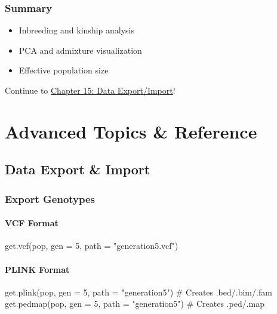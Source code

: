 \documentclass[
  letterpaper,
]{book}
\newenvironment{Shaded}{\begin{snugshade}}{\end{snugshade}}
\newcommand{\AttributeTok}[1]{\textcolor[rgb]{0.40,0.45,0.13}{#1}}
\newcommand{\CommentTok}[1]{\textcolor[rgb]{0.37,0.37,0.37}{#1}}
\newcommand{\DecValTok}[1]{\textcolor[rgb]{0.68,0.00,0.00}{#1}}
\newcommand{\FunctionTok}[1]{\textcolor[rgb]{0.28,0.35,0.67}{#1}}
\newcommand{\NormalTok}[1]{\textcolor[rgb]{0.00,0.23,0.31}{#1}}
\newcommand{\StringTok}[1]{\textcolor[rgb]{0.13,0.47,0.30}{#1}}
\providecommand{\tightlist}{%
  \setlength{\itemsep}{0pt}\setlength{\parskip}{0pt}}
\begin{document}
\section{Summary}\label{summary-13}

\begin{itemize}
\tightlist
\item
  Inbreeding and kinship analysis
\item
  PCA and admixture visualization
\item
  Effective population size
\end{itemize}

Continue to \href{15-data-export-import.qmd}{Chapter 15: Data
Export/Import}!

\part{Advanced Topics \& Reference}

\chapter{Data Export \& Import}\label{sec-data-export-import}

\section{Export Genotypes}\label{export-genotypes}

\subsection{VCF Format}\label{vcf-format}

\begin{Shaded}
\begin{Highlighting}[]
\FunctionTok{get.vcf}\NormalTok{(pop, }\AttributeTok{gen =} \DecValTok{5}\NormalTok{, }\AttributeTok{path =} \StringTok{"generation5.vcf"}\NormalTok{)}
\end{Highlighting}
\end{Shaded}

\subsection{PLINK Format}\label{plink-format}

\begin{Shaded}
\begin{Highlighting}[]
\FunctionTok{get.plink}\NormalTok{(pop, }\AttributeTok{gen =} \DecValTok{5}\NormalTok{, }\AttributeTok{path =} \StringTok{"generation5"}\NormalTok{)  }\CommentTok{\# Creates .bed/.bim/.fam}
\FunctionTok{get.pedmap}\NormalTok{(pop, }\AttributeTok{gen =} \DecValTok{5}\NormalTok{, }\AttributeTok{path =} \StringTok{"generation5"}\NormalTok{) }\CommentTok{\# Creates .ped/.map}
\end{Highlighting}
\end{Shaded}
\end{document}

